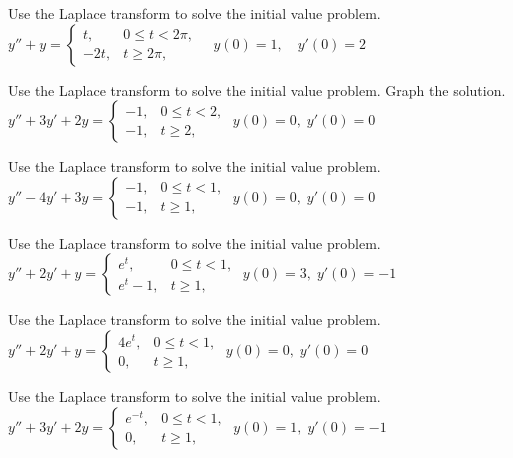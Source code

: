 \documentclass{ximera}
\begin{document}
\begin{problem}\label{exer:8.5.12} Use the Laplace transform to solve the initial value problem.
$y''+y=\left\{\begin{array}{cl} t,&0\le
t<2\pi,\\-2t,&t\ge 2\pi,\end{array}\right.\quad y(0)=1,\quad y'(0)=2$
\end{problem}

\begin{problem}\label{exer:8.5.13} Use the Laplace transform to solve the initial value problem.  Graph the solution.
$y''+3y'+2y=\left\{\begin{array}{cl}-1,&0\le
t<2,\\-1,&t\ge 2,\end{array}\right.\;  y(0)=0,\;  y'(0)=0$
\end{problem}

\begin{problem}\label{exer:8.5.14} Use the Laplace transform to solve the initial value problem.
$y''-4y'+3y=\left\{\begin{array}{cl}-1,&0\le
t<1,\\-1,&t\ge 1,\end{array}\right.\;  y(0)=0,\;  y'(0)=0$
\end{problem}

\begin{problem}\label{exer:8.5.15} Use the Laplace transform to solve the initial value problem.
$y''+2y'+y=\left\{\begin{array}{cl}
e^t,&0\le t<1,\\e^t-1,&t\ge 1,\end{array}\right.\;  y(0)=3,\;
y'(0)=-1$
\end{problem}

\begin{problem}\label{exer:8.5.16}
Use the Laplace transform to solve the initial value problem.
$y''+2y'+y=\left\{\begin{array}{cl}
4e^t,&0\le t<1,\\0,&t\ge 1,\end{array}\right.\;  y(0)=0,\;
y'(0)=0$
\end{problem}

\begin{problem}\label{exer:8.5.17} Use the Laplace transform to solve the initial value problem.
$y''+3y'+2y=\left\{\begin{array}{cl}
e^{-t},&0\le t<1,\\0,&t\ge 1,\end{array}\right.\;  y(0)=1,\;  y'(0)=-1$
\end{problem}
\end{document}
